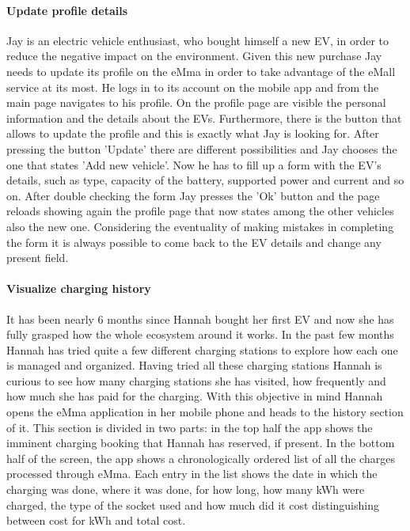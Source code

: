 \paragraph{Update profile details}
Jay is an electric vehicle enthusiast, who bought himself a new EV, in order to reduce the negative impact on the environment. Given this new purchase Jay needs to update its profile on the eMma in order to take advantage of the eMall service at its most. He logs in to its account on the mobile app and from the main page navigates to his profile. On the profile page are visible the personal information and the details about the EVs. Furthermore, there is the button that allows to update the profile and this is exactly what Jay is looking for. After pressing the button 'Update' there are different possibilities and Jay chooses the one that states 'Add new vehicle'. Now he has to fill up a form with the EV's details, such as type, capacity of the battery, supported power and current and so on. After double checking the form Jay presses the 'Ok' button and the page reloads showing again the profile page that now states among the other vehicles also the new one. Considering the eventuality of making mistakes in completing the form it is always possible to come back to the EV details and change any present field.

\paragraph{Visualize charging history}
It has been nearly 6 months since Hannah bought her first EV and now she has fully grasped how the whole ecosystem around it works. In the past few months Hannah has tried quite a few different charging stations to explore how each one is managed and organized. Having tried all these charging stations Hannah is curious to see how many charging stations she has visited, how frequently and how much she has paid for the charging. With this objective in mind Hannah opens the eMma application in her mobile phone and heads to the history section of it. This section is divided in two parts: in the top half the app shows the imminent charging booking that Hannah has reserved, if present. In the bottom half of the screen, the app shows a chronologically ordered list of all the charges processed through eMma. Each entry in the list shows the date in which the charging was done, where it was done, for how long, how many kWh were charged, the type of the socket used and how much did it cost distinguishing between cost for kWh and total cost.

